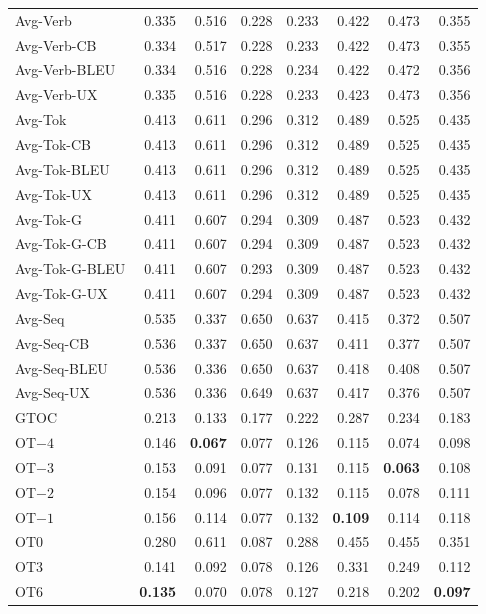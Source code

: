 {\begin{longtable}{@{}lrrrrrrr@{}}
\addlinespace
Avg-Verb & 0.335 & 0.516 & 0.228 & 0.233 & 0.422 & 0.473 & 0.355 \\
Avg-Verb-CB & 0.334 & 0.517 & 0.228 & 0.233 & 0.422 & 0.473 & 0.355 \\
Avg-Verb-BLEU & 0.334 & 0.516 & 0.228 & 0.234 & 0.422 & 0.472 & 0.356 \\
Avg-Verb-UX & 0.335 & 0.516 & 0.228 & 0.233 & 0.423 & 0.473 & 0.356 \\
\addlinespace
Avg-Tok & 0.413 & 0.611 & 0.296 & 0.312 & 0.489 & 0.525 & 0.435 \\
Avg-Tok-CB & 0.413 & 0.611 & 0.296 & 0.312 & 0.489 & 0.525 & 0.435 \\
Avg-Tok-BLEU & 0.413 & 0.611 & 0.296 & 0.312 & 0.489 & 0.525 & 0.435 \\
Avg-Tok-UX & 0.413 & 0.611 & 0.296 & 0.312 & 0.489 & 0.525 & 0.435 \\
Avg-Tok-G & 0.411 & 0.607 & 0.294 & 0.309 & 0.487 & 0.523 & 0.432 \\
Avg-Tok-G-CB & 0.411 & 0.607 & 0.294 & 0.309 & 0.487 & 0.523 & 0.432 \\
Avg-Tok-G-BLEU & 0.411 & 0.607 & 0.293 & 0.309 & 0.487 & 0.523 & 0.432 \\
Avg-Tok-G-UX & 0.411 & 0.607 & 0.294 & 0.309 & 0.487 & 0.523 & 0.432 \\
\addlinespace
Avg-Seq & 0.535 & 0.337 & 0.650 & 0.637 & 0.415 & 0.372 & 0.507 \\
Avg-Seq-CB & 0.536 & 0.337 & 0.650 & 0.637 & 0.411 & 0.377 & 0.507 \\
Avg-Seq-BLEU & 0.536 & 0.336 & 0.650 & 0.637 & 0.418 & 0.408 & 0.507 \\
Avg-Seq-UX & 0.536 & 0.336 & 0.649 & 0.637 & 0.417 & 0.376 & 0.507 \\
\addlinespace
GTOC & 0.213 & 0.133 & 0.177 & 0.222 & 0.287 & 0.234 & 0.183 \\
\addlinespace
OT$-4$ & 0.146 & \textbf{0.067} & 0.077 & 0.126 & 0.115 & 0.074 & 0.098 \\
OT$-3$ & 0.153 & 0.091 & 0.077 & 0.131 & 0.115 & \textbf{0.063} & 0.108 \\
OT$-2$ & 0.154 & 0.096 & 0.077 & 0.132 & 0.115 & 0.078 & 0.111 \\
OT$-1$ & 0.156 & 0.114 & 0.077 & 0.132 & \textbf{0.109} & 0.114 & 0.118 \\
OT0 & 0.280 & 0.611 & 0.087 & 0.288 & 0.455 & 0.455 & 0.351 \\
OT3 & 0.141 & 0.092 & 0.078 & 0.126 & 0.331 & 0.249 & 0.112 \\
OT6 & \textbf{0.135} & 0.070 & 0.078 & 0.127 & 0.218 & 0.202 & \textbf{0.097} \\

\end{longtable}}
